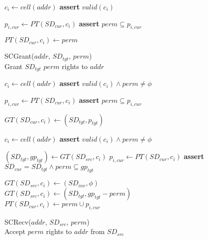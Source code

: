 \begin{figure}
\begin{multicols}{2}
\begin{algorithm}[H]
\begin{algorithmic}[1]
        \State $c_i \gets cell(addr)$
        \State \textbf{assert} $valid(c_i)$

        \State $p_{i,cur} \gets PT(SD_{cur}, c_i) $
        \State \textbf{assert} $perm \subseteq p_{i,cur}$

        \State $PT(SD_{cur}, c_i) \gets perm$
      \end{algorithmic}
      \label{alg:scprotect}
    \end{algorithm}
    \vspace{-0.5\baselineskip}

    \begin{algorithm}[H]
      \caption{SCGrant($addr$, $SD_{tgt}$, $perm$) \\
      Grant $SD_{tgt}$ $perm$ rights to $addr$             }
      \begin{algorithmic}[1]

        \State $c_i \gets cell(addr)$
        \State \textbf{assert} $valid(c_i) \land perm \ne \phi$

        \State $p_{i,cur} \gets PT(SD_{cur}, c_i)$
        \State \textbf{assert} $perm \subseteq p_{i,cur}$

        \State $GT(SD_{cur}, c_i) \gets (SD_{tgt}, p_{tgt})$
      \end{algorithmic}
      \label{alg:scgrant}
    \end{algorithm}
    \vspace{-0.5\baselineskip}

    \begin{algorithm}[H]
      \caption{SCRecv($addr$, $SD_{src}$, $perm$) \\
      Accept $perm$ rights to $addr$ from $SD_{src}$      }
      \begin{algorithmic}[1]

        \State $c_i \gets cell(addr)$
        \State \textbf{assert} $valid(c_i) \land perm \ne \phi$

        \State $(SD_{tgt}, gp_{tgt}) \gets GT(SD_{src}, c_i)$
        \State $p_{i,cur} \gets PT(SD_{cur}, c_i)$
        \State \textbf{assert} $SD_{cur} = SD_{tgt} \land perm \subseteq gp_{tgt}$

          \State $GT(SD_{src}, c_i) \gets (SD_{inv}, \phi)$
        \Else
          \State $GT(SD_{src}, c_i) \gets (SD_{tgt}, gp_{tgt} - perm)$
        \EndIf
        \State $PT(SD_{cur}, c_i) \gets perm \cup p_{i, cur} $

      \end{algorithmic}
      \label{alg:screcv}
    \end{algorithm}
    \vspace{-\baselineskip}


\end{multicols}
\end{figure}
